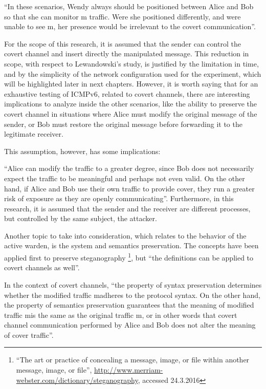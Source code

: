 \documentclass[12pt]{article}
\begin{document}
``In these scenarios, Wendy always should be positioned between Alice and Bob so that she can monitor m\textprime\hspace{2pt} traffic. Were she positioned differently, and were unable to see m\textprime, her presence would be irrelevant to the covert communication''\cite{lewandowski}.

For the scope of this research, it is assumed that the sender can control the covert channel and insert directly the manipulated message. This reduction in scope, with respect to Lewandowski's study, is justified by the limitation in time, and by the simplicity of the network configuration used for the experiment, which will be highlighted later in next chapters. However, it is worth saying that for an exhaustive testing of ICMPv6, related to covert channels, there are interesting implications to analyze inside the other scenarios, like the ability to preserve the covert channel in situations where Alice must modify the original message of the sender, or Bob must restore the original message before forwarding it to the legitimate receiver.

This assumption, however, has some implications:

``Alice can modify the traffic to a greater degree, since Bob does not necessarily expect the traffic to be meaningful and perhaps not even valid. On the other hand, if Alice and Bob use their own traffic to provide cover, they run a greater risk of exposure as they are openly communicating''\cite{lewandowski}. Furthermore, in this research, it is assumed that the sender and the receiver are different processes, but controlled by the same subject, the attacker.

Another topic to take into consideration, which relates to the behavior of the active warden, is the system and semantics preservation. The concepts have been applied first to preserve steganography \footnote{``The art or practice of concealing a message, image, or file within another message, image, or file'', \url{http://www.merriam-webster.com/dictionary/steganography}, accessed 24.3.2016}\cite{lucena2}, but ``the definitions can be applied to covert channels as well''\cite{lewandowski}.

In the context of covert channels, ``the property of syntax preservation determines whether the modified traffic m\textprime\hspace{2pt}adheres to the protocol syntax. On the other hand, the property of semantics preservation guarantees that the meaning of modified traffic m\textprime\hspace{2pt}is the same as the original traffic m, or in other words that covert channel communication performed by Alice and Bob does not alter the meaning of cover traffic''\cite{lewandowski}.
\end{document}
